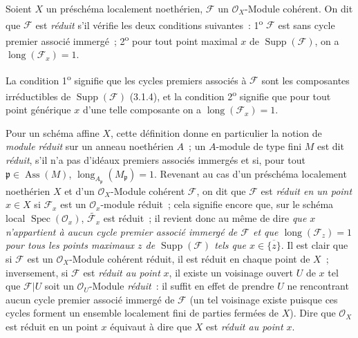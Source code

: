 \begin{definition}[3.2.2]
\label{IV.2.3.2.2-fr}
Soient $X$ un préschéma localement noethérien, $\mathcal F$ un
$\mathcal O_X$-Module cohérent. On dit que $\mathcal F$ est \emph{réduit}
s'il vérifie les deux conditions suivantes~: 1\textsuperscript{o}
$\mathcal F$ est sans cycle premier associé immergé~; 2\textsuperscript{o}
pour tout point maximal $x$ de $\operatorname{Supp}(\mathcal F)$, on a
$\operatorname{long}(\mathcal F_x)=1$.
\end{definition}

La condition 1\textsuperscript{o} signifie que les cycles premiers associés à
$\mathcal F$ sont les composantes irréductibles de
$\operatorname{Supp}(\mathcal F)$ (3.1.4), et la condition
2\textsuperscript{o} signifie que pour tout point générique $x$ d'une telle
composante on a $\operatorname{long}(\mathcal F_x)=1$.

Pour un schéma affine $X$, cette définition donne en particulier la notion de
\emph{module réduit} sur un anneau noethérien $A$~; un $A$-module de type fini
$M$ est dit \emph{réduit}, s'il n'a pas d'idéaux premiers associés immergés et
si, pour tout $\mathfrak p\in\operatorname{Ass}(M)$,
$\operatorname{long}_{A_\mathfrak p}(M_\mathfrak p)=1$. Revenant au cas d'un
préschéma localement noethérien $X$ et d'un $\mathcal O_X$-Module cohérent
$\mathcal F$, on dit que $\mathcal F$ est \emph{réduit en un point} $x\in X$
si $\mathcal F_x$ est un $\mathcal O_x$-module réduit~; cela signifie encore
que, sur le schéma local $\operatorname{Spec}(\mathcal O_x)$,
$\widetilde{\mathcal F_x}$ est réduit~; il revient donc au même de dire
\emph{que $x$ n'appartient à aucun cycle premier associé immergé de
$\mathcal F$ et que $\operatorname{long}(\mathcal F_z)=1$ pour tous les
points maximaux $z$ de $\operatorname{Supp}(\mathcal F)$ tels que
$x\in\overline{\{z\}}$}. Il est clair que si $\mathcal F$ est un
$\mathcal O_X$-Module cohérent réduit, il est réduit en chaque point de $X$~;
inversement, si $\mathcal F$ est \emph{réduit au point} $x$, il existe un
voisinage ouvert $U$ de $x$ tel que $\mathcal F|U$ soit un
$\mathcal O_U$-Module \emph{réduit}~: il suffit en effet de prendre $U$ ne
rencontrant aucun cycle premier associé immergé de $\mathcal F$ (un tel
voisinage existe puisque ces cycles forment un ensemble localement fini de
parties
fermées de $X$). Dire que $\mathcal O_X$ est réduit en un point $x$ équivaut à
dire que $X$ est \emph{réduit au point $x$}.


